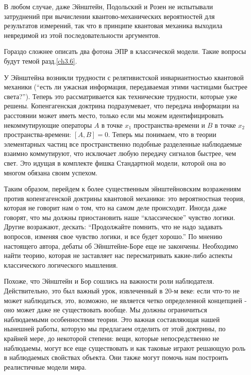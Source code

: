 \documentclass[main.tex]{subfiles}
\begin{document}
В любом случае, даже Эйнштейн, Подольский и Розен не испытывали затруднений при вычислении квантово-механических вероятностей для результатов измерений, так что в принципе квантовая механика выходила невредимой из этой последовательности аргументов.

Гораздо сложнее описать два фотона ЭПР в классической модели. Такие вопросы будут темой разд.\ref{ch3.6}.

У Эйнштейна возникли трудности с релятивистской инвариантностью квантовой механики (``есть ли ужасная информация, передаваемая этими частицами быстрее света?''). Теперь это рассматривается как технические трудности, которые уже решены. Копенгагенская доктрина подразумевает, что передача информации на расстоянии может иметь место, только если мы можем идентифицировать некоммутирующие операторы $A$ в точке $x_1$ пространства-времени и $B$ в точке $x_2$ пространства-времени: $[A, B] = 0$. Теперь мы понимаем, что в теории элементарных частиц все пространственно подобные разделенные наблюдаемые взаимно коммутируют, что исключает любую передачу сигналов быстрее, чем свет. Это идущая в комплекте фишка Стандартной модели, которой она во многом обязана своим успехом.

Таким образом, перейдем к более существенным эйнштейновским возражениям против копенгагенской доктрины квантовой механики: это вероятностная теория, которая не говорит нам о том, что на самом деле происходит. Иногда даже говорят, что мы должны приостановить наше ``классическое'' чувство логики. Другие возражают, дескать: ``Продолжайте помнить, что не надо задавать вопросов, изменяя свое чувство логики, и все будет хорошо.'' По мнению настоящего автора, дебаты об Эйнштейне-Боре еще не закончены. Необходимо найти теорию, которая не заставляет нас пересматривать какие-либо аспекты классического логического мышления.

Похоже, что Эйнштейн и Бор сошлись на важности роли наблюдателя. Действительно, это был важный урок, извлеченный в 20-м веке: если что-то не может наблюдаться, это, возможно, не является четко определенной концепцией - оно может даже не существовать вообще. Мы должны ограничиться наблюдаемыми особенностями теории. Это важная составляющая нашей нынешней работы, которую мы предлагаем отделить от этой доктрины, по крайней мере, до некоторой степени: вещи, которые непосредственно не наблюдаемы, могут все еще существовать и как таковые играют решающую роль в наблюдаемых свойствах объекта. Они также могут помочь нам построить реалистичные модели мира.
\end{document}
